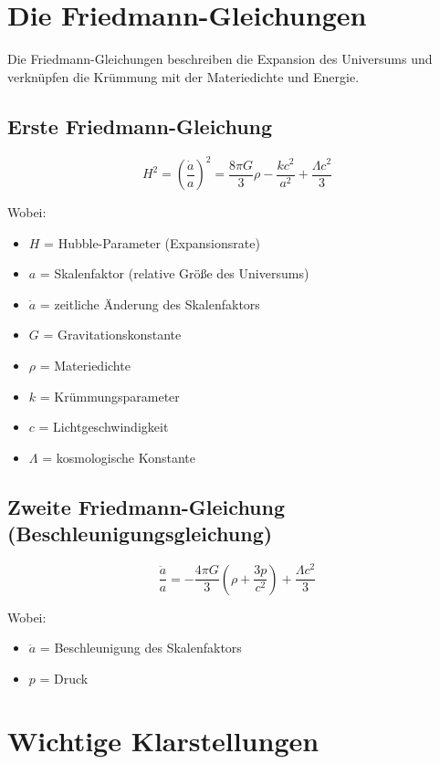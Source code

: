 \documentclass[a4paper,12pt]{article}
\begin{document}
	\section{Die Friedmann-Gleichungen}
	
	Die Friedmann-Gleichungen beschreiben die Expansion des Universums und verknüpfen die Krümmung mit der Materiedichte und Energie.
	
	\subsection{Erste Friedmann-Gleichung}
	
	\begin{equation}
		H^2 = \left(\frac{\dot{a}}{a}\right)^2 = \frac{8\pi G}{3}\rho - \frac{kc^2}{a^2} + \frac{\Lambda c^2}{3}
	\end{equation}
	
	Wobei:
	\begin{itemize}
		\item $H$ = Hubble-Parameter (Expansionsrate)
		\item $a$ = Skalenfaktor (relative Größe des Universums)
		\item $\dot{a}$ = zeitliche Änderung des Skalenfaktors
		\item $G$ = Gravitationskonstante
		\item $\rho$ = Materiedichte
		\item $k$ = Krümmungsparameter
		\item $c$ = Lichtgeschwindigkeit
		\item $\Lambda$ = kosmologische Konstante
	\end{itemize}
	
	\subsection{Zweite Friedmann-Gleichung (Beschleunigungsgleichung)}
	
	\begin{equation}
		\frac{\ddot{a}}{a} = -\frac{4\pi G}{3}\left(\rho + \frac{3p}{c^2}\right) + \frac{\Lambda c^2}{3}
	\end{equation}
	
	Wobei:
	\begin{itemize}
		\item $\ddot{a}$ = Beschleunigung des Skalenfaktors
		\item $p$ = Druck
	\end{itemize}
	
	\section{Wichtige Klarstellungen}
	
\end{document}
